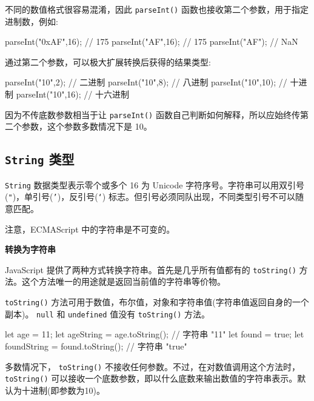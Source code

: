 不同的数值格式很容易混淆，因此 \texttt{parseInt()} 函数也接收第二个参数，用于指定进制数，例如:

\begin{JavaScript}
parseInt("0xAF",16);    // 175
parseInt("AF",16);      // 175
parseInt("AF");         // NaN
\end{JavaScript}

通过第二个参数，可以极大扩展转换后获得的结果类型:

\begin{JavaScript}
parseInt("10",2);       // 二进制
parseInt("10",8);       // 八进制
parseInt("10",10);      // 十进制
parseInt("10",16);      // 十六进制
\end{JavaScript}

因为不传底数参数相当于让 \texttt{parseInt()} 函数自己判断如何解释，所以应始终传第二个参数，这个参数多数情况下是 10。


\subsection{\texttt{String} 类型}

\texttt{String} 数据类型表示零个或多个 16 为 Unicode 字符序号。字符串可以用双引号(\texttt{"})，单引号(\texttt{'})，反引号(\texttt{`}) 标志。但引号必须同队出现，不同类型引号不可以随意匹配。

注意，ECMAScript 中的字符串是不可变的。

\noindent\textbf{转换为字符串}

JavaScript 提供了两种方式转换字符串。首先是几乎所有值都有的 \texttt{toString()} 方法。这个方法唯一的用途就是返回当前值的字符串等价物。

\texttt{toString()} 方法可用于数值，布尔值，对象和字符串值(字符串值返回自身的一个副本)。 \texttt{null} 和 \texttt{undefined} 值没有 \texttt{toString()} 方法。

\begin{JavaScript}
let age = 11;
let ageString = age.toString();         // 字符串 "11"
let found = true;
let foundString = found.toString();     // 字符串 "true"
\end{JavaScript}

多数情况下， \texttt{toString()} 不接收任何参数。不过，在对数值调用这个方法时，\texttt{toString()} 可以接收一个底数参数，即以什么底数来输出数值的字符串表示。默认为十进制(即参数为10)。

